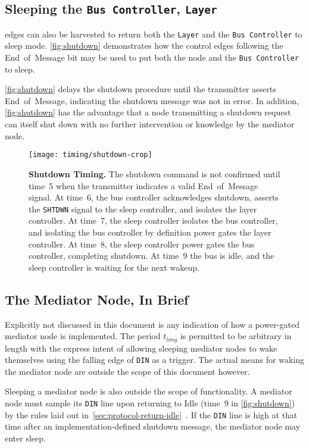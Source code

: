 \subsection{Sleeping the {\tt Bus Controller}, {\tt Layer}}
\bus edges can also be harvested to return both the {\tt Layer} and the
{\tt Bus~Controller} to sleep mode. \autoref{fig:shutdown} demonstrates how
the control edges following the End~of~Message bit may be used to put both the
node and the {\tt Bus~Controller} to sleep.

\autoref{fig:shutdown} delays the shutdown procedure until the transmitter
asserts End~of~Message, indicating the shutdown message was not in error.
In addition, \autoref{fig:shutdown} has the advantage that a node transmitting
a shutdown request can itself shut down with no further intervention or
knowledge by the mediator node.

\begin{figure}
  \centering
  \texttt{[image: timing/shutdown-crop]}
  \caption{\textbf{Shutdown Timing.} \textmd{
    The shutdown command is not confirmed until time~5 when the transmitter
    indicates a valid End~of~Message signal. At time~6, the bus controller
    acknowledges shutdown, asserts the {\tt SHTDWN} signal to the sleep
    controller, and isolates the layer controller. At time~7, the sleep
    controller isolates the bus controller, and isolating the bus controller
    by definition power gates the layer controller. At time~8, the sleep
    controller power gates the bus controller, completing shutdown. At time~9
    the bus is idle, and the sleep controller is waiting for the next wakeup.
  }}
  \label{fig:shutdown}
\end{figure}

\subsection{The Mediator Node, In Brief}
Explicitly not discussed in this document is any indication of how a
power-gated mediator node is implemented. The period $t_{long}$ is permitted to
be arbitrary in length with the express intent of allowing sleeping mediator
nodes to wake themselves using the falling edge of {\tt DIN} as a trigger. The
actual means for waking the mediator node are outside the scope of this
document however.

Sleeping a mediator node is also outside the scope of \bus functionality.
A mediator node must sample its {\tt DIN} line upon returning to Idle (time~9
in \autoref{fig:shutdown}) by the rules laid out
in~\ref{sec:protocol-return-idle}~. If the
{\tt DIN} line is high at that time after an implementation-defined shutdown
message, the mediator node may enter sleep.

